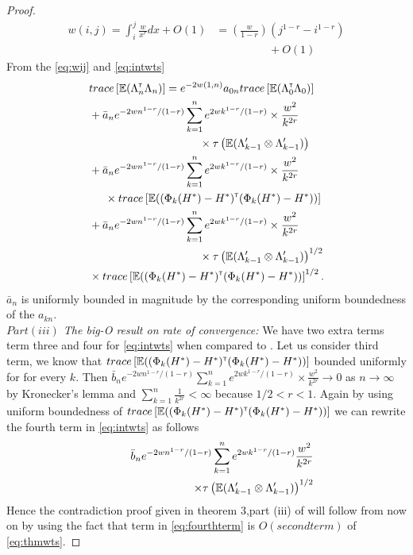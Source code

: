 \begin{proof}
\begin{align}\label{eq:intwts}
w(i,j) = \int_i^j \frac{w}{x^r} dx + O(1) &= \left(\frac{w}{1-r}\right)(j^{1-r}-i^{1-r})\nonumber\\ &\hspace{2cm}+O(1)
\end{align}
From the \eqref{eq:wij} and \eqref{eq:intwts}
\begin{align}\label{eq:thmwts}
 & trace \left[\E (\Lambda_n \tr \Lambda_n)\right] =  e^{-2 w(1,n)} a_{0n} trace \left[\E (\Lambda_0 \tr \Lambda_0)\right]  \nonumber\\ &+ \bar a_n e^{-2 w n^{1-r}/(1-r)} \sum_{k=1}^n e^{2 w k^{1-r}/(1-r)}  \times \frac{w^2}{k^{2 r}} \nonumber\\& \hspace{3.5cm} \times \tau\left(\E (\Lambda_{k-1}' \otimes \Lambda_{k-1}')\right)  \nonumber\\ &+ \bar a_n e^{-2 w n^{1-r}/(1-r)} \sum_{k=1}^n e^{2 w k^{1-r}/(1-r)}  \times \frac{w^2}{k^{2 r}}  \nonumber\\&  \hspace{0.5cm}\times trace\left[\E ((\Phi_k(H^*) - H^*) \tr  (\Phi_k(H^*) - H^*))\right] \nonumber\\ &+ \bar a_n e^{-2 w n^{1-r}/(1-r)} \sum_{k=1}^n e^{2 w k^{1-r}/(1-r)}  \times \frac{w^2}{k^{2 r}}  \nonumber\\&\hspace{3.5cm}\times \tau\left(\E (\Lambda_{k-1}' \otimes \Lambda_{k-1}')\right)^{1/2}\nonumber\\&\times trace\left[\E ((\Phi_k(H^*) - H^*) \tr  (\Phi_k(H^*) - H^*))\right]^{1/2}.
\end{align} $\bar a_n$ is uniformly bounded in magnitude by the corresponding uniform boundedness of the $a_{kn}$.\\
\emph{$Part(iii)$ The big-O result on rate of convergence:}
 We have two extra terms term three and four for \eqref{eq:intwts} when compared to \cite{spall-jacobian}. Let us consider third term, we know that $trace\left[\mathbb{E} ((\Phi_k(H^*) - H^*) ^\mathsf{\scriptscriptstyle T}  (\Phi_k(H^*) - H^*))\right]$ bounded uniformly for for every $k$. Then  $\bar b_n e^{-2 w n^{1-r}/(1-r)} \sum_{k=1}^n e^{2 w k^{1-r}/(1-r)}  \times \frac{w^2}{k^{2 r}} \to 0$ as $n \to \infty$ by Kronecker's lemma and $\sum_{k=1}^n \frac{1}{k^{2 r}} < \infty$ because $1/2 < r < 1$.  Again by using uniform boundedness of $trace\left[\mathbb{E} ((\Phi_k(H^*) - H^*) ^\mathsf{\scriptscriptstyle T}  (\Phi_k(H^*) - H^*))\right]$ we can rewrite  the fourth term in \eqref{eq:intwts} as follows 
 \begin{align}\label{eq:fourthterm}
 \bar b_n e^{-2 w n^{1-r}/(1-r)} \sum_{k=1}^n e^{2 w k^{1-r}/(1-r)}  \frac{w^2}{k^{2 r}} \nonumber \\ \hspace{3cm}\times \tau\left(\E (\Lambda_{k-1}' \otimes \Lambda_{k-1}')\right)^{1/2}
 \end{align}
 Hence the contradiction proof given in theorem 3,part (iii) of \cite{spall-jacobian} will follow from now on by using the fact that term in \eqref{eq:fourthterm} is $O(second term)$ of \eqref{eq:thmwts}. 
 
 
\end{proof}